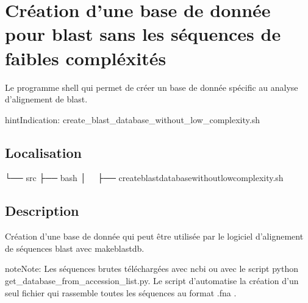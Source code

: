 \documentclass[letterpaper,10pt,french]{sphinxmanual}
\begin{document}
\section{Création d’une base de donnée pour blast sans les séquences de faibles compléxités}
\label{\detokenize{bash/create_blast_database_without_low_complexity.sh:creation-d-une-base-de-donnee-pour-blast-sans-les-sequences-de-faibles-complexites}}\label{\detokenize{bash/create_blast_database_without_low_complexity.sh::doc}}
Le programme shell qui permet de créer un base de donnée spécific au analyse d’alignement de blast.

\begin{sphinxadmonition}{hint}{Indication:}
create\_blast\_database\_without\_low\_complexity.sh
\end{sphinxadmonition}


\subsection{Localisation}
\label{\detokenize{bash/create_blast_database_without_low_complexity.sh:localisation}}
\begin{sphinxVerbatim}[commandchars=\\\{\}]
└── src
 ├── bash
 │   ├── create\PYGZus{}blast\PYGZus{}database\PYGZus{}without\PYGZus{}low\PYGZus{}complexity.sh
\end{sphinxVerbatim}


\subsection{Description}
\label{\detokenize{bash/create_blast_database_without_low_complexity.sh:description}}
Création d’une base de donnée qui peut être utilisée par le logiciel d’alignement de séquences blast avec makeblastdb.

\begin{sphinxadmonition}{note}{Note:}
Les séquences brutes téléchargées avec ncbi ou avec le script python get\_database\_from\_accession\_list.py. Le script d’automatise la création d’un seul fichier qui rassemble toutes les séquences au format .fna .
\end{sphinxadmonition}
\end{document}
